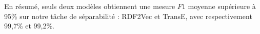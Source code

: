 
En résumé, seuls deux modèles obtiennent une mesure $F1$ moyenne supérieure à 95\% sur notre tâche de séparabilité : RDF2Vec et TransE, avec respectivement 99,7\% et 99,2\%. 
